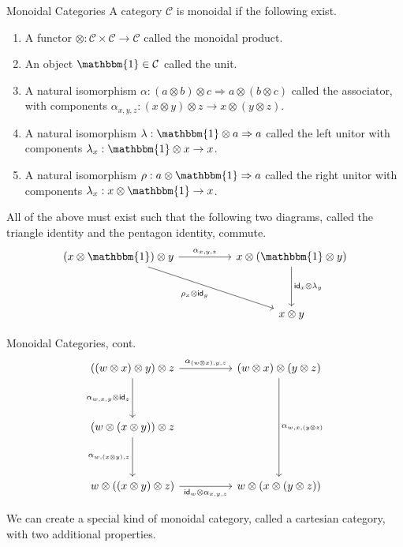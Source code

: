 \documentclass[12pt]{article}
\begin{document}
\begin{definition}{Monoidal Categories}{}
    A category $\mathcal{C}$ is monoidal if the following exist.
    \begin{enumerate}
        \item A functor $\otimes:\mathcal{C}\times\mathcal{C}\rightarrow\mathcal{C}$ called the monoidal product.
        \item An object $\mathbbm{1}\in\mathcal{C}$ called the unit.
        \item A natural isomorphism $\alpha : (a\otimes b)\otimes c\Rightarrow a\otimes (b\otimes c)$ called the associator, with components $\alpha_{x,y,z}: (x\otimes y)\otimes z\rightarrow x\otimes (y\otimes z)$.
        \item A natural isomorphism $\lambda : \mathbbm{1}\otimes a\Rightarrow a$ called the left unitor with components $\lambda_x : \mathbbm{1}\otimes x\rightarrow x$.
        \item A natural isomorphism $\rho : a\otimes \mathbbm{1}\Rightarrow a$ called the right unitor with components $\lambda_x : x\otimes \mathbbm{1}\rightarrow x$.
    \end{enumerate}
    All of the above must exist such that the following two diagrams, called the triangle identity and the pentagon identity, commute.
    \[\begin{tikzcd}
            {(x\otimes\mathbbm{1})\otimes y} && {x\otimes(\mathbbm{1}\otimes y)} \\
            \\
            && {x\otimes y}
            \arrow["{{\rho_x\otimes \mathsf{id}_y}}"', from=1-1, to=3-3]
            \arrow["{{\mathsf{id}_x\otimes\lambda_y}}", from=1-3, to=3-3]
            \arrow["{{\alpha_{x,y,z}}}", from=1-1, to=1-3]
        \end{tikzcd}\]
\end{definition}
\begin{definition*}{Monoidal Categories, cont.}{}
    \[\begin{tikzcd}
            {((w\otimes x)\otimes y)\otimes z} && {(w\otimes x)\otimes(y\otimes z)} \\
            \\
            {(w\otimes (x\otimes y))\otimes z} \\
            \\
            {w\otimes ((x\otimes y)\otimes z)} && {w\otimes (x\otimes (y\otimes z))}
            \arrow["{{\alpha_{w,x,(y\otimes z)}}}", from=1-3, to=5-3]
            \arrow["{{\alpha_{(w\otimes x),y,z}}}", from=1-1, to=1-3]
            \arrow["{{\alpha_{w,x,y}\otimes \mathsf{id}_z}}"', from=1-1, to=3-1]
            \arrow["{{\alpha_{w,(x\otimes y),z}}}"', from=3-1, to=5-1]
            \arrow["{{\mathsf{id}_w\otimes \alpha_{x,y,z}}}"', from=5-1, to=5-3]
        \end{tikzcd}\]
\end{definition*}
We can create a special kind of monoidal category, called a cartesian category, with two additional properties.
\end{document}
